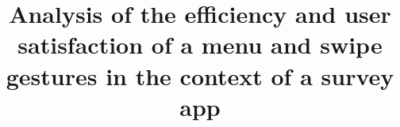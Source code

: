 \documentclass{sig-alternate-05-2015}
\begin{document}






%

\title{Analysis of the efficiency and user satisfaction of a menu and swipe gestures in the context of a survey app}

%
%
%
%
%
\end{document}
